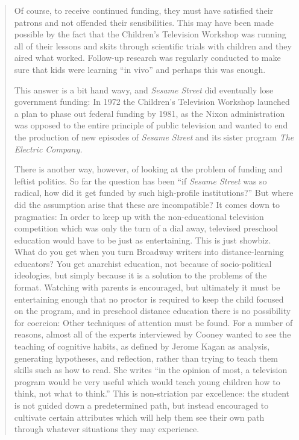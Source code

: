 \documentclass[12pt,letterpaper]{article}
\newcommand{\ses}{\textit{Sesame Street }}
\begin{document}
\begin{quote}
	Of course, to receive continued funding, they must have satisfied their 
	patrons and not offended their sensibilities. This may have been made 
	possible by the fact that the Children's Television Workshop  was
	running all of their lessons and skits through scientific trials with 
	children and they aired what worked. Follow-up research was regularly 
	conducted to make sure that kids were learning ``in 
	vivo''\autocite[118]{Davis} and perhaps	this was enough.

	This answer is a bit hand wavy, and \ses did eventually lose government
	funding: In 1972 the Children's Television Workshop launched a plan to 
	phase out federal funding by 1981, as the Nixon administration was 
	opposed to the entire principle of public television and wanted to end 
	the production of new episodes of \ses and its sister program
	\textit{The Electric Company.}\autocite[218]{Davis} 

	There is another 
	way, however, of looking at the problem of funding and leftist politics.
	So far the question has been ``if \ses was so 
	radical, how did it get funded by such high-profile institutions?'' But
	where did the assumption arise that these are incompatible? It comes 
	down to pragmatics: In order to keep up with the non-educational 
	television competition which was only the turn of a dial away, televised
	preschool education would have to be just as 
	entertaining.\autocite[38]{Cooney} This is just showbiz. What do you get
	when you turn Broadway writers into distance-learning educators? You get
	anarchist education, not because of socio-political ideologies, but 
	simply because it is a solution to the problems of the format. Watching 
	with parents is encouraged, but ultimately it must be entertaining 
	enough that no proctor is required to keep the child focused on the 
	program, and in preschool distance education there is no possibility for
	coercion: Other techniques of attention must be found. For a number of 
	reasons, almost all of the experts interviewed by Cooney wanted to see 
	the teaching of cognitive habits, as defined by Jerome Kagan as 
	analysis, generating hypotheses, and reflection, rather than trying to 
	teach them skills such as how to read. She writes 
	``in the opinion of most, a television program would be very useful 
	which would teach young children how to think, not what to 
	think.''\autocite[23]{Cooney} This is non-striation par excellence: the
	student is not guided down a 
	predetermined path, but instead encouraged to cultivate certain 
	attributes which will help them see their own path through whatever 
	situations they may experience.


\end{quote}
\end{document}
